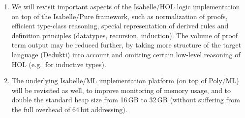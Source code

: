 


\begin{enumerate}

  \item We will revisit important aspects of the Isabelle/HOL logic
  implementation on top of the Isabelle/Pure framework, such as
  normalization of proofs, efficient type-class reasoning, special
  representation of derived rules and definition principles
  (datatypes, recursion, induction). The volume of proof term output
  may be reduced further, by taking more structure of the target
  language (Dedukti) into account and omitting certain low-level
  reasoning of HOL (e.g.\ for inductive types).

  \item The underlying Isabelle/ML implementation platform (on top of
  Poly/ML) will be revisited as well, to improve monitoring of memory
  usage, and to double the standard heap size from 16\,GB to 32\,GB
  (without suffering from the full overhead of 64\,bit addressing).

\end{enumerate}
